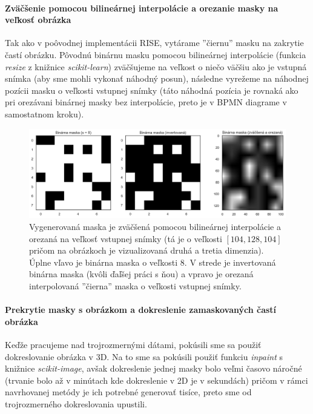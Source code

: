 \paragraph{Zväčšenie pomocou bilineárnej interpolácie a orezanie masky na veľkosť obrázka}

Tak ako v poôvodnej implementácii RISE, vytárame ''čiernu'' masku na zakrytie častí obrázku. Pôvodnú binárnu masku pomocou bilineárnej interpolácie (funkcia \textit{resize} z knižnice \textit{scikit-learn}) zväčšujeme na veľkost o niečo väčšiu ako je vstupná snímka (aby sme mohli vykonať náhodný posun), následne vyrežeme na náhodnej pozícii masku o veľkosti vstupnej snímky (táto náhodná pozícia je rovnaká ako pri orezávani binárnej masky bez interpolácie, preto je v BPMN diagrame v samostatnom kroku).

\begin{figure}[H]
    \centering
    \includegraphics[width=13cm]{assets/images/interpolated_mask.png}
    \caption{Vygenerovaná maska je zväčšená pomocou bilineárnej interpolácie a orezaná na veľkosť vstupnej snímky (tá je o veľkosti $[104, 128, 104]$ pričom na obrázkoch je vizualizovaná druhá a tretia dimenzia). Úplne vľavo je binárna maska o veľkosti $8$. V strede je invertovaná binárna maska (kvôli ďaľšej práci s ňou) a vpravo je orezaná interpolovaná ''čierna'' maska o veľkosti vstupnej snímky.}
    \label{fig:interpolated_mask}
\end{figure}

\paragraph{Prekrytie masky s obrázkom a dokreslenie zamaskovaných častí obrázka}

Keďže pracujeme nad trojrozmernými dátami, pokúsili sme sa použiť dokreslovanie obrázka v 3D. Na to sme sa pokúsili použiť funkciu \textit{inpaint} s knižnice \textit{scikit-image}, avšak dokreslenie jednej masky bolo veľmi časovo náročné (trvanie bolo až v minútach kde dokreslenie v 2D je v sekundách) pričom v rámci navrhovanej metódy je ich potrebné generovať tisíce, preto sme od trojrozmerného dokreslovania upustili.


